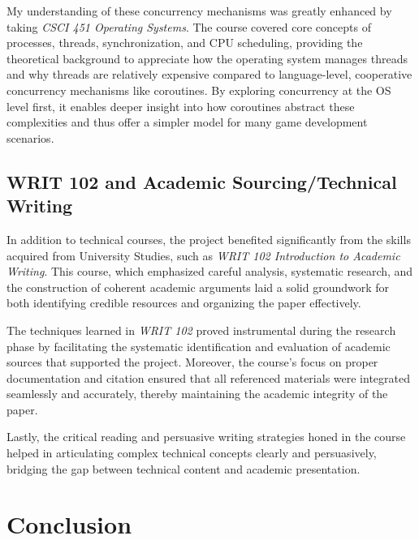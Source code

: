 \documentclass[a4paper, 12pt, one column, aas_macros]{article}
\begin{document}
My understanding of these concurrency mechanisms was greatly enhanced by taking \textit{CSCI 451 Operating Systems}. The course covered core concepts of processes, threads, synchronization, and CPU scheduling, providing the theoretical background to appreciate how the operating system manages threads and why threads are relatively expensive compared to language-level, cooperative concurrency mechanisms like coroutines. By exploring concurrency at the OS level first, it enables deeper insight into how coroutines abstract these complexities and thus offer a simpler model for many game development scenarios.

\subsection{WRIT 102 and Academic Sourcing/Technical Writing}
In addition to technical courses, the project benefited significantly from the skills acquired from University Studies, such as \textit{WRIT 102 Introduction to Academic Writing}. This course, which emphasized careful analysis, systematic research, and the construction of coherent academic arguments laid a solid groundwork for both identifying credible resources and organizing the paper effectively.

The techniques learned in \textit{WRIT 102} proved instrumental during the research phase by facilitating the systematic identification and evaluation of academic sources that supported the project. Moreover, the course’s focus on proper documentation and citation ensured that all referenced materials were integrated seamlessly and accurately, thereby maintaining the academic integrity of the paper.

Lastly, the critical reading and persuasive writing strategies honed in the course helped in articulating complex technical concepts clearly and persuasively, bridging the gap between technical content and academic presentation.

\section{Conclusion}


\end{document}
